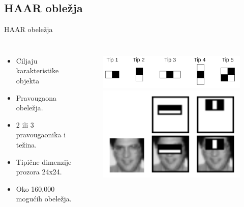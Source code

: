 \documentclass{beamer}
\begin{document}
\subsection{HAAR obležja}
\begin{frame}{HAAR obeležja}
    \begin{columns}[onlytextwidth,T]
      \column{\dimexpr\linewidth-50mm-0mm}

      \begin{itemize}
      \item<1-> Ciljaju karakteristike objekta
      \item<1-> Pravougaona obeležja.
      \item<1-> 2 ili 3 pravougaonika i težina.
      \item<1-> Tipične dimenzije prozora 24x24.
      \item<1-> Oko 160,000 mogućih obeležja.
      \end{itemize}

      \column{60mm}

      \begin{figure}[H]
        \centering
        \includegraphics[width=0.85\linewidth]{../images/haar_features1}\\
        \vspace{1\baselineskip}
        \includegraphics[width=0.85\linewidth]{../images/haar_features2}\\
      \end{figure}
    \end{columns}
\end{frame}
\end{document}
